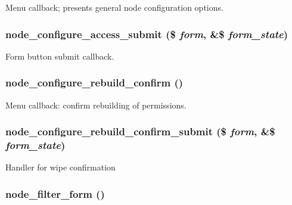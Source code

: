Menu callback; presents general node configuration options. \hypertarget{node_8admin_8inc_4181047f10a38f2bc1e071e5f0b3361c}{
\subsubsection[{node\_\-configure\_\-access\_\-submit}]{\setlength{\rightskip}{0pt plus 5cm}node\_\-configure\_\-access\_\-submit (\$ {\em form}, \/  \&\$ {\em form\_\-state})}}
\label{node_8admin_8inc_4181047f10a38f2bc1e071e5f0b3361c}


Form button submit callback. \hypertarget{node_8admin_8inc_650b907eb478b9c293e4b93e3ecb560d}{
\subsubsection[{node\_\-configure\_\-rebuild\_\-confirm}]{\setlength{\rightskip}{0pt plus 5cm}node\_\-configure\_\-rebuild\_\-confirm ()}}
\label{node_8admin_8inc_650b907eb478b9c293e4b93e3ecb560d}


Menu callback: confirm rebuilding of permissions. \hypertarget{node_8admin_8inc_81b709fbced4062b5c58137a9255fab4}{
\subsubsection[{node\_\-configure\_\-rebuild\_\-confirm\_\-submit}]{\setlength{\rightskip}{0pt plus 5cm}node\_\-configure\_\-rebuild\_\-confirm\_\-submit (\$ {\em form}, \/  \&\$ {\em form\_\-state})}}
\label{node_8admin_8inc_81b709fbced4062b5c58137a9255fab4}


Handler for wipe confirmation \hypertarget{node_8admin_8inc_2b7edb82b488db11ffde4fa60958004d}{
\subsubsection[{node\_\-filter\_\-form}]{\setlength{\rightskip}{0pt plus 5cm}node\_\-filter\_\-form ()}}
\label{node_8admin_8inc_2b7edb82b488db11ffde4fa60958004d}


